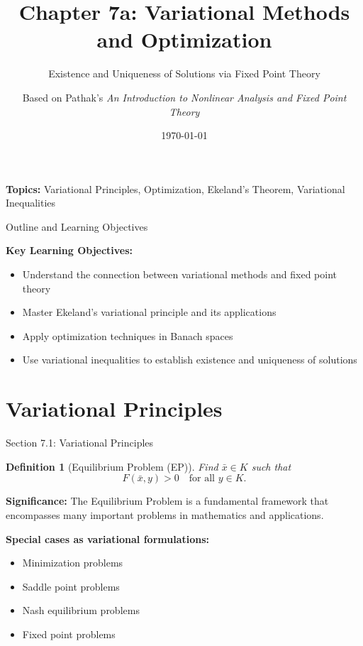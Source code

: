 \documentclass[aspectratio=169,10pt]{beamer}
\title{Chapter 7a: Variational Methods and Optimization}
\subtitle{Existence and Uniqueness of Solutions via Fixed Point Theory}
\author{Based on Pathak's \textit{An Introduction to Nonlinear Analysis and Fixed Point Theory}}
\date{\today}
\newtheorem{definition}{Definition}
\begin{document}
\begin{frame}
  \titlepage
  \vspace{-0.5cm}
  {\color{MyBlue}\textbf{Topics:}} Variational Principles, Optimization, Ekeland's Theorem, Variational Inequalities
\end{frame}

\begin{frame}{Outline and Learning Objectives}
  \tableofcontents

  \vspace{1cm}
  \textbf{Key Learning Objectives:}
  \begin{itemize}
    \item Understand the connection between variational methods and fixed point theory
    \item Master Ekeland's variational principle and its applications
    \item Apply optimization techniques in Banach spaces
    \item Use variational inequalities to establish existence and uniqueness of solutions
  \end{itemize}
\end{frame}

\section{Variational Principles}

\begin{frame}{Section 7.1: Variational Principles}
  \begin{definition}[Equilibrium Problem (EP)]
    Find $\bar{x} \in K$ such that
    \[
    F(\bar{x}, y) > 0 \quad \text{for all } y \in K.
    \]
  \end{definition}

  \textbf{Significance:} The Equilibrium Problem is a fundamental framework that encompasses many important problems in mathematics and applications.

  \vspace{0.5cm}

  \textbf{Special cases as variational formulations:}
  \begin{itemize}
    \item Minimization problems
    \item Saddle point problems
    \item Nash equilibrium problems
    \item Fixed point problems
  \end{itemize}
\end{frame}
\end{document}
